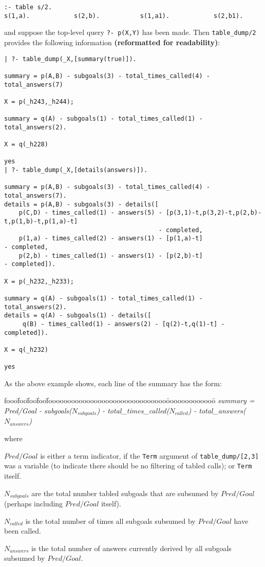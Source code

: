 \begin{description}
\begin{verbatim}
:- table s/2.
s(1,a).            s(2,b).           s(1,a1).            s(2,b1).
\end{verbatim}
and suppose the top-level query {\tt ?- p(X,Y)} has been made.  Then
{\tt table\_dump/2} provides the following information {\bf
 (reformatted for readability)}:
%
{\small
\begin{verbatim}
| ?- table_dump(_X,[summary(true)]).

summary = p(A,B) - subgoals(3) - total_times_called(4) - total_answers(7)

X = p(_h243,_h244);

summary = q(A) - subgoals(1) - total_times_called(1) - total_answers(2).

X = q(_h228)

yes
| ?- table_dump(_X,[details(answers)]).

summary = p(A,B) - subgoals(3) - total_times_called(4) - total_answers(7).
details = p(A,B) - subgoals(3) - details([
    p(C,D) - times_called(1) - answers(5) - [p(3,1)-t,p(3,2)-t,p(2,b)-t,p(1,b)-t,p(1,a)-t] 
                                          - completed,
    p(1,a) - times_called(2) - answers(1) - [p(1,a)-t]                         - completed,
    p(2,b) - times_called(1) - answers(1) - [p(2,b)-t]                         - completed]).

X = p(_h232,_h233);

summary = q(A) - subgoals(1) - total_times_called(1) - total_answers(2).
details = q(A) - subgoals(1) - details([
     q(B) - times_called(1) - answers(2) - [q(2)-t,q(1)-t] - completed]).

X = q(_h232)

yes
\end{verbatim}
}

As the above example shows, each line of the summary has the form:

\begin{tabbing}
fooo\=foo\=foo\=foo\=fooooooooooooooooooooooooooooooo\=ooooooooooooo\=\kill
%
{\em   summary = } \\
\> {\em Pred/Goal  - subgoals($N_{subgoals}$) - total\_times\_called($N_{called}$) - total\_answers($N_{answers}$)}
%
\end{tabbing}
where 
\bi
\item $Pred/Goal$ is either a term indicator, if the {\tt Term}
  argument of {\tt table\_dump/[2,3]} was a variable (to indicate there
  should be no filtering of tabled calls); or {\tt Term} itself.
%
\item $N_{subgoals}$ are the total number tabled subgoals that are
  subsumed by $Pred/Goal$ (perhaps including $Pred/Goal$ itself).
%
\item $N_{called}$ is the total number of times all subgoals subsumed
  by $Pred/Goal$ have been called.
%
\item $N_{answers}$ is the total number of answers currently derived
  by all subgoals subsumed by $Pred/Goal$.
\ei


\end{description}
